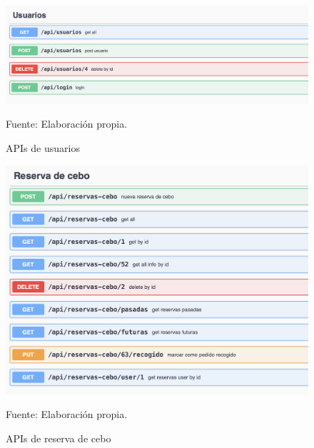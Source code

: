 \begin{figure}[H]
\begin{center}
\includegraphics[scale=0.7]{./Images/APIusuarios.png}
\caption{APIs de usuarios} Fuente: Elaboración propia.

\label{fig:fig3}

\end{center}
\end{figure}

\begin{figure}[H]
\begin{center}
\includegraphics[scale=0.7]{./Images/APIreservacebo.png}
\caption{APIs de reserva de cebo} Fuente: Elaboración propia.

\label{fig:fig4}

\end{center}
\end{figure}

